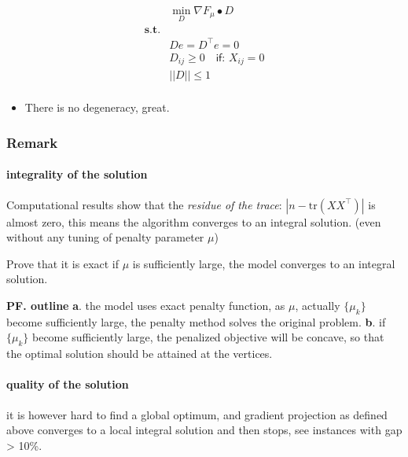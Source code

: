 \documentclass[
  10pt,
  a4paper,
,tablecaptionabove
]{scrartcl}
\providecommand{\tightlist}{%
  \setlength{\itemsep}{0pt}\setlength{\parskip}{0pt}}
\begin{document}
\[\begin{aligned}
&\min_D \nabla F_\mu \bullet D   \\
\mathbf{s.t.} & \\
&D e = D^\top e = 0 \\ 
&D_{ij} \ge 0 \quad \textsf{if: } X_{ij} = 0\\ 
&||D||\le 1 \\
\end{aligned}\]

\begin{itemize}
\tightlist
\item
  There is no degeneracy, great.
\end{itemize}

\hypertarget{remark}{%
\subsubsection{Remark}\label{remark}}

\hypertarget{integrality-of-the-solution}{%
\paragraph{integrality of the
solution}\label{integrality-of-the-solution}}

Computational results show that the \emph{residue of the trace}:
\(|n - \textrm{tr}(XX^\top)|\) is almost zero, this means the algorithm
converges to an integral solution. (even without any tuning of penalty
parameter \(\mu\))

Prove that it is exact if \(\mu\) is sufficiently large, the model
converges to an integral solution.

\textbf{PF. outline} \textbf{a}. the model uses exact penalty function,
as \(\mu\), actually \(\{\mu_k\}\) become sufficiently large, the
penalty method solves the original problem. \textbf{b}. if \(\{\mu_k\}\)
become sufficiently large, the penalized objective will be concave, so
that the optimal solution should be attained at the vertices.

\hypertarget{quality-of-the-solution}{%
\paragraph{quality of the solution}\label{quality-of-the-solution}}

it is however hard to find a global optimum, and gradient projection as
defined above converges to a local integral solution and then stops, see
instances with gap \textgreater{} 10\%.
\end{document}
